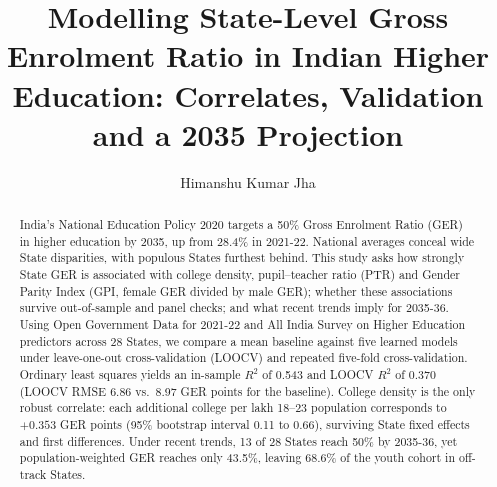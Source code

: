 \documentclass[runningheads]{llncs}
\begin{document}
\title{Modelling State-Level Gross Enrolment Ratio in Indian Higher Education: Correlates, Validation and a 2035 Projection}

\author{Himanshu Kumar Jha}


\maketitle

\begin{abstract}
India's National Education Policy 2020 targets a 50\% Gross Enrolment Ratio (GER) in higher education by 2035, up from 28.4\% in 2021-22. National averages conceal wide State disparities, with populous States furthest behind. This study asks how strongly State GER is associated with college density, pupil--teacher ratio (PTR) and Gender Parity Index (GPI, female GER divided by male GER); whether these associations survive out-of-sample and panel checks; and what recent trends imply for 2035-36. Using Open Government Data for 2021-22 and All India Survey on Higher Education predictors across 28 States, we compare a mean baseline against five learned models under leave-one-out cross-validation (LOOCV) and repeated five-fold cross-validation. Ordinary least squares yields an in-sample $R^2$ of 0.543 and LOOCV $R^2$ of 0.370 (LOOCV RMSE 6.86 vs.\ 8.97 GER points for the baseline). College density is the only robust correlate: each additional college per lakh 18--23 population corresponds to $+0.353$ GER points (95\% bootstrap interval 0.11 to 0.66), surviving State fixed effects and first differences. Under recent trends, 13 of 28 States reach 50\% by 2035-36, yet population-weighted GER reaches only 43.5\%, leaving 68.6\% of the youth cohort in off-track States.

\end{abstract}















\appendix

\end{document}
